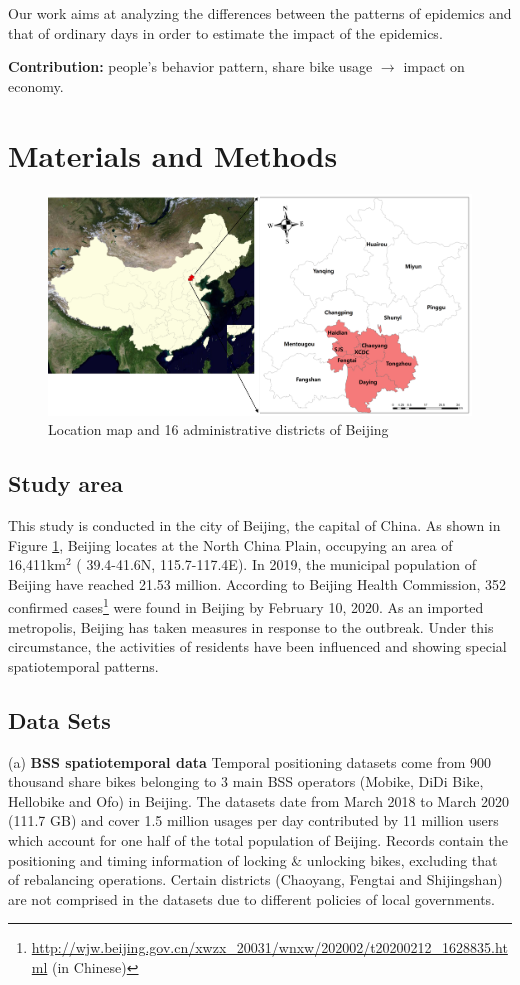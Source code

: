 \documentclass[preprints,ijgi,submit,moreauthors]{Definitions/mdpi}
\begin{document}
Our work aims at analyzing the differences between the patterns of epidemics and that of ordinary days in order to estimate the impact of the epidemics.

\textbf{Contribution:} people's behavior pattern, share bike usage $\to$ impact on economy.

\section{Materials and Methods}

\begin{figure}[H]
    \centering
    \includegraphics[width=\textwidth]{Definitions/StudyArea.png}
    \caption{Location map and 16 administrative districts of Beijing}
    \label{fig:study_area}
\end{figure}

\subsection{Study area}
This study is conducted in the city of Beijing, the capital of China. 
As shown in Figure \ref{fig:study_area}, Beijing locates at the North China Plain, occupying an area of 16,411km$^2$ ( 39.4{\degree}-41.6{\degree}N, 115.7{\degree}-117.4{\degree}E). 
In 2019, the municipal population of Beijing have reached 21.53 million. According to Beijing Health Commission, 352 confirmed cases\footnote{\url{http://wjw.beijing.gov.cn/xwzx_20031/wnxw/202002/t20200212_1628835.html} (in Chinese)} were found in Beijing by February 10, 2020. 
As an imported metropolis, Beijing has taken measures in response to the outbreak. 
Under this circumstance, the activities of residents have been influenced and showing special spatiotemporal patterns.

\subsection{Data Sets}
(a) \textbf{BSS spatiotemporal data} Temporal positioning datasets come from 900 thousand share bikes belonging to 3 main BSS operators (Mobike, DiDi Bike, Hellobike and Ofo) in Beijing.
The datasets date from March 2018 to March 2020 (111.7 GB) and cover 1.5 million usages per day contributed by 11 million users which account for one half of the total population of Beijing.
Records contain the positioning and timing information of locking \& unlocking bikes, excluding that of rebalancing operations.
Certain districts (Chaoyang, Fengtai and Shijingshan) are not comprised in the datasets due to different policies of local governments.
\end{document}

